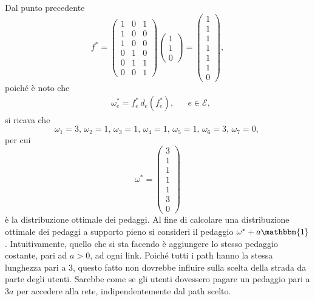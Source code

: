\begin{alphaparts}
    \questionpart
    Dal punto precedente 
       \[ f^{*} = \begin{pmatrix}
        1 & 0 & 1\\
        1 & 0 & 0\\
        1 & 0 & 0\\
        0 & 1 & 0\\
        0 & 1 & 1\\
        0 & 0 & 1
    \end{pmatrix} \begin{pmatrix} 1  \\ 1 \\ 0 \end{pmatrix}
     = \begin{pmatrix}
        1 \\ 1 \\ 1 \\ 1 \\ 1 \\ 1 \\ 0
    \end{pmatrix}, \]
    poiché è noto che 
    \begin{align} &\omega_{e}^{*} = f_{e}^{*}\,d_{e} \left(f_{e}^{*}\right),&& e\in\mathcal{E}, \end{align}
    si ricava che 
    \[ \omega_1 = 3, \,
    \omega_2 = 1, \,
    \omega_3 = 1, \,
    \omega_4 = 1, \,
    \omega_5 = 1, \,
    \omega_6 = 3, \,
    \omega_7 = 0, \,
    \]
    per cui 
    \[ \omega^{*} = \begin{pmatrix}
        3 \\ 1 \\ 1 \\ 1 \\ 1 \\ 3 \\ 0
    \end{pmatrix}\]
    è la distribuzione ottimale dei pedaggi.
    Al fine di calcolare una distribuzione ottimale dei pedaggi a supporto pieno si consideri il pedaggio \(\omega^{*} + a\mathbbm{1}\). Intuitivamente, quello che si sta facendo è aggiungere lo stesso pedaggio costante, pari ad \(a>0\), ad ogni link. Poiché tutti i path hanno la stessa lunghezza pari a $3$, questo fatto non dovrebbe influire sulla scelta della strada da parte degli utenti. Sarebbe come se gli utenti dovessero pagare un pedaggio pari a $3a$ per accedere alla rete, indipendentemente dal path scelto.


\end{alphaparts}
